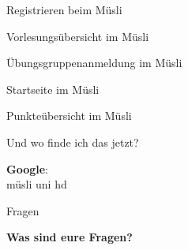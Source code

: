 \begin{frame}{Registrieren beim Müsli}
        \vspace*{-10pt}
\end{frame}

\begin{frame}{Vorlesungsübersicht im Müsli}
        \vspace*{-50pt}
\end{frame}

\begin{frame}{Übungsgruppenanmeldung im Müsli}
        \vspace*{-50pt}
\end{frame}

\begin{frame}{Startseite im Müsli}
        \vspace*{-40pt}
\end{frame}

\begin{frame}{Punkteübersicht im Müsli}
        \vspace*{-40pt}
\end{frame}

\begin{frame}{Und wo finde ich das jetzt?}
    \begin{center}
        \huge{\textbf{Google}:}\\
        \vspace{1em}
        \huge{\frqq müsli uni hd\flqq}\\
        \vspace{2em}
    \end{center}
\end{frame}

\begin{frame}{Fragen}
    \begin{center}
        \vfill
        \huge{\textbf{Was sind eure Fragen?}}\\
        \vfill
    \end{center}
\end{frame}

